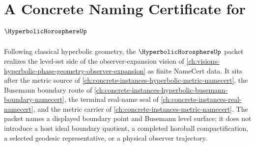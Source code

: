 \chapter{A Concrete Naming Certificate for $\HyperbolicHorosphereUp$}
\label{ch:concrete-instances-hyperbolic-horosphere-namecert}

Following classical hyperbolic geometry, the $\HyperbolicHorosphereUp$ packet realizes the level-set side of the observer-expansion vision of \autoref{ch:visions-hyperbolic-phase-geometry-observer-expansion} as finite NameCert data. It sits after the metric source of \autoref{ch:concrete-instances-hyperbolic-metric-namecert}, the Busemann boundary route of \autoref{ch:concrete-instances-hyperbolic-busemann-boundary-namecert}, the terminal real-name seal of \autoref{ch:concrete-instances-real-namecert}, and the metric carrier of \autoref{ch:concrete-instances-metric-namecert}. The packet names a displayed boundary point and Busemann level surface; it does not introduce a host ideal boundary quotient, a completed horoball compactification, a selected geodesic representative, or a physical observer trajectory.

